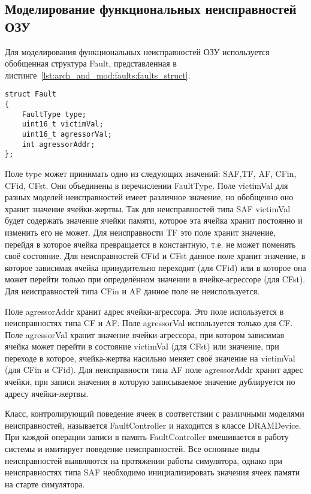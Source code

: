 \subsection{Моделирование функциональных неисправностей ОЗУ}
\label{sub:arch_and_mod:faults}

Для моделирования функциональных неисправностей ОЗУ используется обобщенная структура Fault, представленная в листинге~\ref{lst:arch_and_mod:faults:faults_struct}. 
\begin{lstlisting}[style=cplusplusstyle, caption={Структура описания функциональной неисправности ОЗУ}, label=lst:arch_and_mod:faults:faults_struct]
struct Fault
{
    FaultType type;
    uint16_t victimVal;
    uint16_t agressorVal;
    int agressorAddr;
};
\end{lstlisting} 

Поле type может принимать одно из следующих значений: SAF,TF, AF, CFin, CFid, CFst. Они объединены в перечислении FaultType. Поле victimVal для разных моделей неисправностей имеет различное значение, но обобщенно оно хранит значение ячейки-жертвы. Так для неисправностей типа SAF victimVal будет содержать значение ячейки памяти, которое эта ячейка хранит постоянно и изменить его не может. Для неисправности TF это поле хранит значение, перейдя в которое ячейка превращается в константную, т.е. не может поменять своё состояние. Для неисправностей CFid и CFst данное поле хранит значение, в которое зависимая ячейка принудительно переходит (для CFid) или в которое она может перейти только при определённом значении в ячейке-агрессоре (для CFst). Для неисправностей типа CFin и AF данное поле не неиспользуется. 

Поле agressorAddr хранит адрес ячейки-агрессора. Это поле используется в неисправностях типа CF и AF. Поле agressorVal используется только для CF. Поле agressorVal хранит значение ячейки-агрессора, при котором зависимая ячейка может перейти в состояние victimVal (для CFst) или значение, при переходе в которое, ячейка-жертва насильно меняет своё значение на victimVal (для CFin и CFid). Для неисправности типа AF поле agressorAddr хранит адрес ячейки, при записи значения в которую записываемое значение дублируется по адресу ячейки-жертвы.

Класс, контролирующий поведение ячеек в соответствии с различными моделями неисправностей, называется FaultController и находится в классе DRAMDevice. При каждой операции записи в память FaultController вмешивается в работу системы и имитирует поведение неисправностей. Все основные виды неисправностей выявляются на протяжении работы симулятора, однако при неисправностях типа SAF необходимо инициализировать значения ячеек памяти на старте симулятора. 

